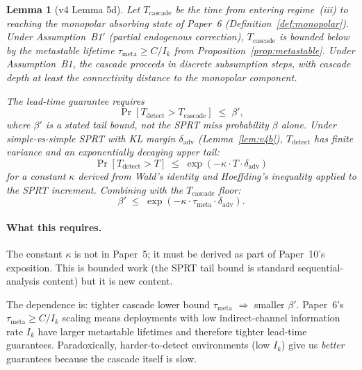 \documentclass{article}
\newtheorem{lemma}{Lemma}
\begin{document}
\begin{lemma}[v4 Lemma 5d]
\label{lem:v4d}
Let $T_{\mathrm{cascade}}$ be the time from entering regime~(iii) to
reaching the monopolar absorbing state of Paper~6
(Definition~\ref{def:monopolar}).  Under Assumption~B1$'$ (partial
endogenous correction), $T_{\mathrm{cascade}}$ is bounded below by the
metastable lifetime $\tau_{\mathrm{meta}} \geq C/I_k$ from
Proposition~\ref{prop:metastable}.  Under Assumption~B1, the cascade
proceeds in discrete subsumption steps, with cascade depth at least
the connectivity distance to the monopolar component.

The lead-time guarantee requires
\begin{equation}
\label{eq:lead_time}
\Pr[T_{\mathrm{detect}} > T_{\mathrm{cascade}}] \;\leq\; \beta',
\end{equation}
where $\beta'$ is a stated tail bound, \emph{not} the SPRT
miss probability $\beta$ alone.  Under simple-vs-simple SPRT with
KL margin $\delta_{\mathrm{adv}}$ (Lemma~\ref{lem:v4b}),
$T_{\mathrm{detect}}$ has finite variance and an exponentially
decaying upper tail:
\begin{equation}
\Pr[T_{\mathrm{detect}} > T] \;\leq\; \exp(-\kappa \cdot
  T \cdot \delta_{\mathrm{adv}})
\end{equation}
for a constant $\kappa$ derived from Wald's identity and Hoeffding's
inequality applied to the SPRT increment.  Combining with the
$T_{\mathrm{cascade}}$ floor:
\begin{equation}
\label{eq:lead_time_concrete}
\beta' \;\leq\; \exp(-\kappa \cdot \tau_{\mathrm{meta}} \cdot
  \delta_{\mathrm{adv}}).
\end{equation}
\end{lemma}

\paragraph{What this requires.}
The constant $\kappa$ is not in Paper~5; it must be derived as part of
Paper~10's exposition.  This is bounded work (the SPRT tail bound is
standard sequential-analysis content) but it is new content.

The dependence is: tighter cascade lower bound $\tau_{\mathrm{meta}}$
$\Rightarrow$ smaller $\beta'$.  Paper~6's $\tau_{\mathrm{meta}} \geq
C/I_k$ scaling means deployments with low indirect-channel information
rate $I_k$ have larger metastable lifetimes and therefore tighter
lead-time guarantees.  Paradoxically, harder-to-detect environments
(low $I_k$) give us \emph{better} guarantees because the cascade
itself is slow.
\end{document}
